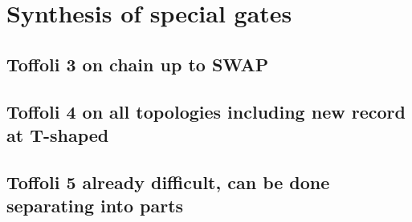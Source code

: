 \documentclass[amsfonts, amssymb, aps, nofootinbib]{revtex4-2}
\begin{document}
\section{Synthesis of special gates}
\subsection{Toffoli 3 on chain up to SWAP}
\subsection{Toffoli 4 on all topologies including new record at T-shaped}
\subsection{Toffoli 5 already difficult, can be done separating into parts}


\end{document}
